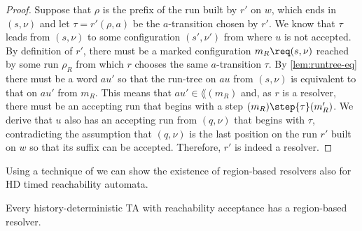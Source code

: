 \begin{proof}
Suppose that $\rho$ is the prefix of the run
built by $r'$ on $w$, which ends in
$(s,\nu)$  and let $\tau = r'(\rho,a)$ be the $a$-transition chosen by $r'$.
We know that $\tau$ leads from $(s,\nu)$ to some configuration $(s',\nu')$ 
from where $u$ is not accepted.
By definition of $r'$, there must be a marked configuration $m_R\req (s,\nu)$ 
reached by some run $\rho_R$ %
from which $r$ chooses the same $a$-transition $\tau$. 
By \cref{lem:runtree-eq} there must be a word $au'$ so that
the run-tree on $au$ from $(s,\nu)$ is equivalent to that on $au'$ from $m_R$.
This means that $au'\in\lang(m_R)$ and, as $r$ is a resolver,
there must be an accepting run that begins with a step $(m_R)\step{\tau}(m'_R)$.
We derive that $u$ also has an accepting run from $(q,\nu)$ that begins with $\tau$, contradicting the assumption that $(q, \nu)$ is the last position on the run $r'$ built on $w$ so that its suffix can be accepted.
Therefore, $r'$ is indeed a resolver.
\end{proof}

Using a technique of \cite{BL22} we can show the existence of region-based resolvers also for HD timed reachability automata.

\begin{lemma}
    \label{lem:positional-reach-resolvers}
Every history-deterministic TA with reachability acceptance has a region-based resolver.
\end{lemma}

